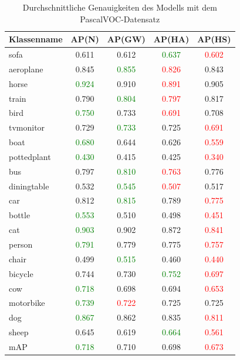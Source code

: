\begin{table}
[h]
\caption{Durchschnittliche Genauigkeiten des Modells mit dem PascalVOC-Datensatz}
\centering
\begin{tabular}{|l|c|c|c|c|}
\hline
Klassenname & AP(N) & AP(GW) & AP(HA) & AP(HS)\\
\hline
sofa & 0.611 & 0.612 & \textcolor{green}{0.637} & \textcolor{red}{0.602}\\ 
aeroplane & 0.845 & \textcolor{green}{0.855} & \textcolor{red}{0.826} & 0.843\\
horse & \textcolor{green}{0.924} & 0.910 & \textcolor{red}{0.891} & 0.905\\
train & 0.790 & \textcolor{green}{0.804} & \textcolor{red}{0.797} & 0.817\\
bird & \textcolor{green}{0.750} & 0.733 & \textcolor{red}{0.691} & 0.708\\ 
tvmonitor & 0.729 & \textcolor{green}{0.733} & 0.725 & \textcolor{red}{0.691}\\
boat & \textcolor{green}{0.680} & 0.644 & 0.626 & \textcolor{red}{0.559}\\
pottedplant & \textcolor{green}{0.430} & 0.415 & 0.425 & \textcolor{red}{0.340}\\
bus & 0.797 & \textcolor{green}{0.810} & \textcolor{red}{0.763} & 0.776\\ 
diningtable & 0.532 & \textcolor{green}{0.545} & \textcolor{red}{0.507} & 0.517\\
car & 0.812 & \textcolor{green}{0.815} & 0.789 & \textcolor{red}{0.775}\\
bottle & \textcolor{green}{0.553} & 0.510 & 0.498 & \textcolor{red}{0.451}\\
cat & \textcolor{green}{0.903} & 0.902 & 0.872 & \textcolor{red}{0.841}\\
person & \textcolor{green}{0.791} & 0.779 & 0.775 & \textcolor{red}{0.757}\\
chair & 0.499 & \textcolor{green}{0.515} & 0.460 & \textcolor{red}{0.440}\\
bicycle & 0.744 & 0.730 & \textcolor{green}{0.752} & \textcolor{red}{0.697}\\
cow & \textcolor{green}{0.718} & 0.698 & 0.694 & \textcolor{red}{0.653}\\
motorbike & \textcolor{green}{0.739} & \textcolor{red}{0.722} & 0.725 & 0.725\\
dog & \textcolor{green}{0.867} & 0.862 & 0.835 & \textcolor{red}{0.811}\\
sheep & 0.645 & 0.619 & \textcolor{green}{0.664} & \textcolor{red}{0.561}\\
\hline
mAP & \textcolor{green}{0.718} & 0.710 & 0.698 & \textcolor{red}{0.673}\\
\hline
\end{tabular}
\end{table}
